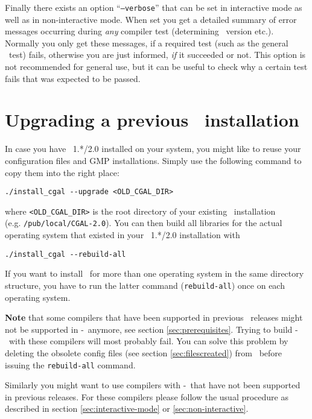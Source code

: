 Finally there exists an option ``\texttt{--verbose}'' that can be set
in interactive mode as well as in non-interactive mode. When set you
get a detailed summary of error messages occurring during \textit{any}
compiler test (determining \stl\ version etc.). Normally you only get
these messages, if a required test (such as the general \stl\ test)
fails, otherwise you are just informed, \textit{if} it succeeded or
not.  This option is not recommended for general use, but it can be
useful to check why a certain test fails that was expected to be
passed.

\section{Upgrading a previous \cgal\ installation}\label{sec:upgrade}

In case you have \cgal\ 1.*/2.0 installed on your system, you might
like to reuse your configuration files and GMP installations. Simply
use the following command to copy them into the right place:
\begin{verbatim}
./install_cgal --upgrade <OLD_CGAL_DIR>
\end{verbatim}
where \texttt{<OLD\_CGAL\_DIR>} is the root directory of your existing
\cgal\ installation\\ (e.g. \texttt{/pub/local/CGAL-2.0}).
You can then build all libraries for the actual operating system that
existed in your \cgal\ 1.*/2.0 installation with 
\begin{verbatim}
./install_cgal --rebuild-all
\end{verbatim}

If you want to install \cgal\ for more than one operating system in
the same directory structure, you have to run the latter command
(\texttt{rebuild-all}) once on each operating system.

\textbf{Note} that some compilers that have been supported in previous
\cgal\ releases might not be supported in \cgal-\cgalrelease\ anymore,
see section \ref{sec:prerequisites}. Trying to build
\cgal-\cgalrelease\ with these compilers will most probably fail. You
can solve this problem by deleting the obsolete config files (see
section \ref{sec:filescreated}) from \cgalinstconfdir\ before issuing
the \texttt{rebuild-all} command.

Similarly you might want to use compilers with \cgal-\cgalrelease\ 
that have not been supported in previous releases. For these compilers
please follow the usual procedure as described in section
\ref{sec:interactive-mode} or \ref{sec:non-interactive}.

